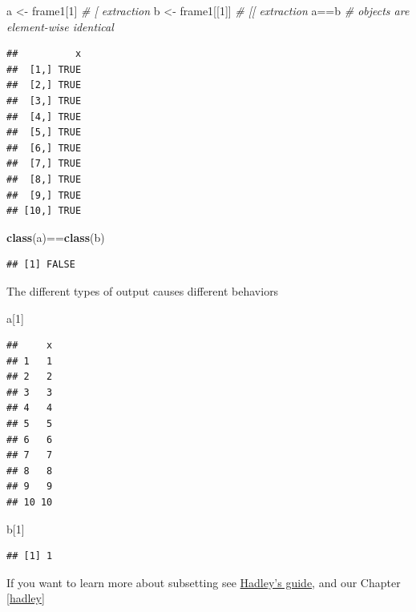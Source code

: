 \documentclass[]{book}
\newenvironment{Shaded}{\begin{snugshade}}{\end{snugshade}}
\newcommand{\KeywordTok}[1]{\textcolor[rgb]{0.13,0.29,0.53}{\textbf{{#1}}}}
\newcommand{\DecValTok}[1]{\textcolor[rgb]{0.00,0.00,0.81}{{#1}}}
\newcommand{\StringTok}[1]{\textcolor[rgb]{0.31,0.60,0.02}{{#1}}}
\newcommand{\CommentTok}[1]{\textcolor[rgb]{0.56,0.35,0.01}{\textit{{#1}}}}
\newcommand{\NormalTok}[1]{{#1}}
\theoremstyle{definition}
\theoremstyle{definition}
\theoremstyle{remark}
\begin{document}
\begin{Shaded}
\begin{Highlighting}[]
\NormalTok{a <-}\StringTok{ }\NormalTok{frame1[}\DecValTok{1}\NormalTok{] }\CommentTok{# [ extraction}
\NormalTok{b <-}\StringTok{ }\NormalTok{frame1[[}\DecValTok{1}\NormalTok{]] }\CommentTok{# [[ extraction}
\NormalTok{a==b }\CommentTok{# objects are element-wise identical }
\end{Highlighting}
\end{Shaded}

\begin{verbatim}
##          x
##  [1,] TRUE
##  [2,] TRUE
##  [3,] TRUE
##  [4,] TRUE
##  [5,] TRUE
##  [6,] TRUE
##  [7,] TRUE
##  [8,] TRUE
##  [9,] TRUE
## [10,] TRUE
\end{verbatim}

\begin{Shaded}
\begin{Highlighting}[]
\KeywordTok{class}\NormalTok{(a)==}\KeywordTok{class}\NormalTok{(b)}
\end{Highlighting}
\end{Shaded}

\begin{verbatim}
## [1] FALSE
\end{verbatim}

The different types of output causes different behaviors

\begin{Shaded}
\begin{Highlighting}[]
\NormalTok{a[}\DecValTok{1}\NormalTok{]}
\end{Highlighting}
\end{Shaded}

\begin{verbatim}
##     x
## 1   1
## 2   2
## 3   3
## 4   4
## 5   5
## 6   6
## 7   7
## 8   8
## 9   9
## 10 10
\end{verbatim}

\begin{Shaded}
\begin{Highlighting}[]
\NormalTok{b[}\DecValTok{1}\NormalTok{]}
\end{Highlighting}
\end{Shaded}

\begin{verbatim}
## [1] 1
\end{verbatim}

If you want to learn more about subsetting see
\href{http://adv-r.had.co.nz/Subsetting.html}{Hadley's guide}, and our
Chapter \ref{hadley}
\end{document}
